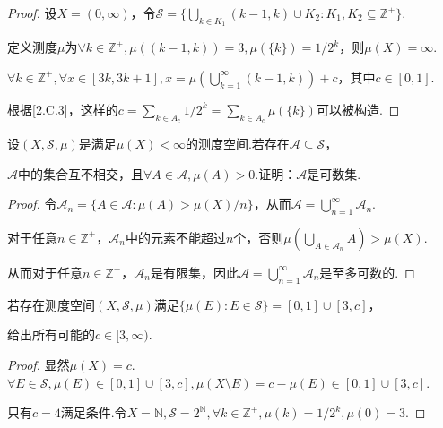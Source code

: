 \begin{proof}
    设\(X=(0, \infty)\)，令\(\mathcal{S}=\{\bigcup_{k \in K_1} (k-1,k) \cup K_2: K_1, K_2 \subseteq \mathbb{Z}^+\}\).

    定义测度\(\mu\)为\(\forall k \in \mathbb{Z}^+, \mu((k-1,k))=3, \mu(\{k\})=1/2^k\)，则\(\mu(X)=\infty\).
    
    \(\forall k \in \mathbb{Z}^+, \forall x \in [3k,3k+1], x=\mu(\bigcup_{k=1}^\infty (k-1,k))+c\)，其中\(c \in [0,1]\).

    {\kaishu 根据\cref{2.C.3}，这样的\(c=\sum_{k \in A_c} 1/2^k=\sum_{k \in A_c} \mu(\{k\})\)可以被构造}.
\end{proof}

\begin{problem}[5]\label{2.C.5}
    设\((X, \mathcal{S}, \mu)\)是满足\(\mu(X)<\infty\)的测度空间.若存在\(\mathcal{A} \subseteq \mathcal{S}\)，

    \(\mathcal{A}\)中的集合互不相交，且\(\forall A \in \mathcal{A}, \mu(A)>0\).证明：\(\mathcal{A}\)是可数集.
\end{problem}

\begin{proof}
    令\(\mathcal{A}_n=\{A \in \mathcal{A}: \mu(A)>\mu(X)/n\}\)，从而\(\mathcal{A}=\bigcup_{n=1}^\infty \mathcal{A}_n\).

    对于任意\(n \in \mathbb{Z}^+\)，\(\mathcal{A}_n\)中的元素不能超过\(n\)个，否则\(\mu(\bigcup_{A \in \mathcal{A}_n} A)>\mu(X)\).

    从而对于任意\(n \in \mathbb{Z}^+\)，\(\mathcal{A}_n\)是有限集，因此\(\mathcal{A}=\bigcup_{n=1}^\infty \mathcal{A}_n\)是至多可数的.
\end{proof}

\begin{problem}[6]\label{2.C.6}
    若存在测度空间\((X, \mathcal{S}, \mu)\)满足\(\{\mu(E): E \in \mathcal{S}\}=[0,1] \cup [3,c]\)，

    给出所有可能的\(c \in [3,\infty)\).
\end{problem}

\begin{proof}
    显然\(\mu(X)=c\).\(\forall E \in \mathcal{S}, \mu(E) \in [0,1] \cup [3,c], \mu(X \setminus E)=c-\mu(E) \in [0,1] \cup [3,c]\).

    只有\(c=4\)满足条件.令\(X=\mathbb{N}, \mathcal{S}=2^{\mathbb{N}}, \forall k \in \mathbb{Z}^+, \mu(k)=1/2^k, \mu(0)=3\).
\end{proof}

\newpage

